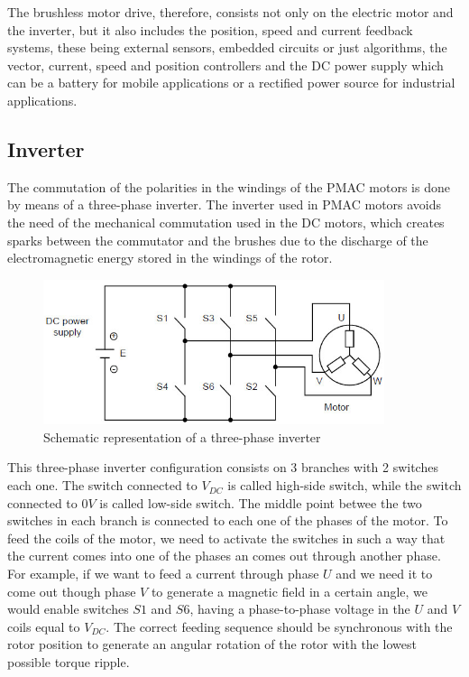 The brushless motor drive, therefore, consists not only on the electric motor and the inverter, but it also includes the position, speed and current feedback systems, these being external sensors, embedded circuits or just algorithms, the vector, current, speed and position controllers and the \ac{DC} power supply which can be a battery for mobile applications or a rectified power source for industrial applications.

\subsection{Inverter}\label{subsection:inverter}

The commutation of the polarities in the windings of the \ac{PMAC} motors is done by means of a three-phase inverter. The inverter used in \ac{PMAC} motors avoids the need of the mechanical commutation used in the \ac{DC} motors, which creates sparks between the commutator and the brushes due to the discharge of the electromagnetic energy stored in the windings of the rotor. 

\begin{figure}[htbp]
\centering
\includegraphics[width=10cm]{Images/inverter_2.png} 
\caption[Simple Three-Phase Inverter]{Schematic representation of a three-phase inverter}
\label{fig:inverter_2}
\end{figure}

This three-phase inverter configuration consists on 3 branches with 2 switches each one. The switch connected to $V_{DC}$ is called high-side switch, while the switch connected to $0V$ is called low-side switch. The middle point betwee the two switches in each branch is connected to each one of the phases of the motor. To feed the coils of the motor, we need to activate the switches in such a way that the current comes into one of the phases an comes out through another phase. For example, if we want to feed a current through phase $U$ and we need it to come out though phase $V$ to generate a magnetic field in a certain angle, we would enable switches $S1$ and $S6$, having a phase-to-phase voltage in the $U$ and $V$ coils equal to $V_{DC}$. The correct feeding sequence should be synchronous with the rotor position to generate an angular rotation of the rotor with the lowest possible torque ripple.

